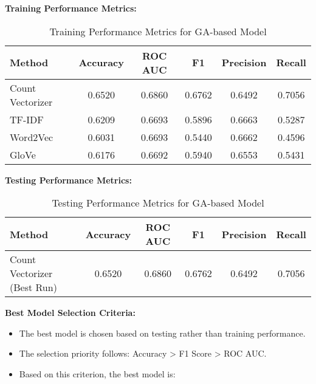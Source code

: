 ${}$\\
\textbf{Training Performance Metrics:}

\begin{table}[H]
    \centering
    \caption{Training Performance Metrics for GA-based Model}
    \label{tab:ga-training-metrics}
    \begin{tabular}{|l|c|c|c|c|c|}
        \hline
        \textbf{Method} & \textbf{Accuracy} & \textbf{ROC AUC} & \textbf{F1} & \textbf{Precision} & \textbf{Recall} \\ 
        \hline
        Count Vectorizer & 0.6520 & 0.6860 & 0.6762 & 0.6492 & 0.7056 \\ 
        \hline
        TF-IDF & 0.6209 & 0.6693 & 0.5896 & 0.6663 & 0.5287 \\ 
        \hline
        Word2Vec & 0.6031 & 0.6693 & 0.5440 & 0.6662 & 0.4596 \\ 
        \hline
        GloVe & 0.6176 & 0.6692 & 0.5940 & 0.6553 & 0.5431 \\ 
        \hline
    \end{tabular}
\end{table}

${}$\\
\textbf{Testing Performance Metrics:}

\begin{table}[H]
    \centering
    \caption{Testing Performance Metrics for GA-based Model}
    \label{tab:ga-testing-metrics}
    \begin{tabular}{|l|c|c|c|c|c|}
        \hline
        \textbf{Method} & \textbf{Accuracy} & \textbf{ROC AUC} & \textbf{F1} & \textbf{Precision} & \textbf{Recall} \\ 
        \hline
        Count Vectorizer (Best Run) & 0.6520 & 0.6860 & 0.6762 & 0.6492 & 0.7056 \\ 
        \hline
    \end{tabular}
\end{table}

${}$\\
\textbf{Best Model Selection Criteria:}

\begin{itemize}
    \item The best model is chosen based on testing rather than training performance.
    \item The selection priority follows: Accuracy > F1 Score > ROC AUC.
    \item Based on this criterion, the best model is:
\end{itemize}

